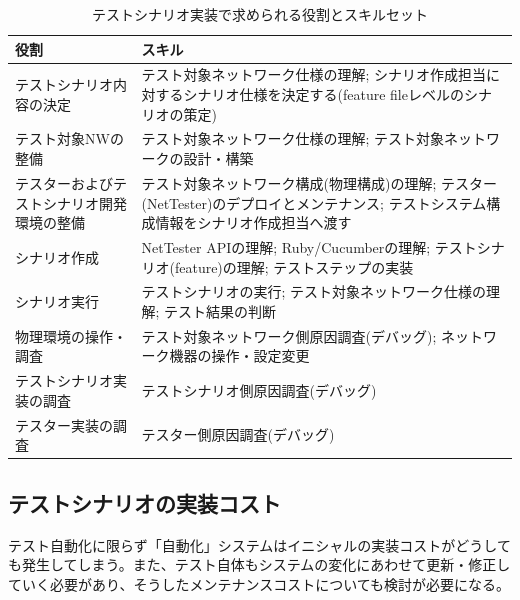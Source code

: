 \begin{table}[h]
 \centering
 \caption{テストシナリオ実装で求められる役割とスキルセット}
 \label{tab:skillset}
 \begin{tabular}[t]{p{}|p{}}
  \hline
  役割 & スキル \\
  \hline
  \hline
  テストシナリオ内容の決定 & テスト対象ネットワーク仕様の理解; シナリオ作成担当に対するシナリオ仕様を決定する(feature fileレベルのシナリオの策定) \\ \hline
  テスト対象NWの整備 & テスト対象ネットワーク仕様の理解; テスト対象ネットワークの設計・構築 \\ \hline
  テスターおよびテストシナリオ開発環境の整備 & テスト対象ネットワーク構成(物理構成)の理解; テスター(NetTester)のデプロイとメンテナンス; テストシステム構成情報をシナリオ作成担当へ渡す \\ \hline
  シナリオ作成 & NetTester APIの理解; Ruby/Cucumberの理解; テストシナリオ(feature)の理解; テストステップの実装 \\ \hline
  シナリオ実行 & テストシナリオの実行; テスト対象ネットワーク仕様の理解; テスト結果の判断 \\ \hline
  物理環境の操作・調査 & テスト対象ネットワーク側原因調査(デバッグ); ネットワーク機器の操作・設定変更 \\ \hline
  テストシナリオ実装の調査 & テストシナリオ側原因調査(デバッグ) \\ \hline
  テスター実装の調査 & テスター側原因調査(デバッグ) \\ \hline
 \end{tabular}
\end{table}

  \subsection{テストシナリオの実装コスト}

テスト自動化に限らず「自動化」システムはイニシャルの実装コストがどうして
も発生してしまう。また、テスト自体もシステムの変化にあわせて更新・修正し
ていく必要があり、そうしたメンテナンスコストについても検討が必要になる。

